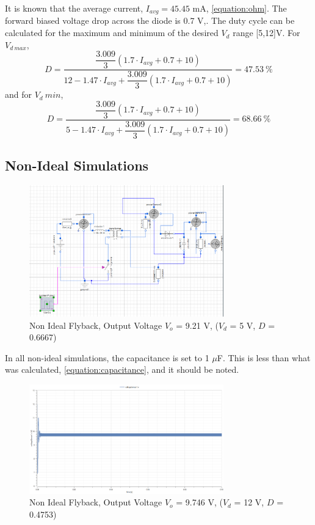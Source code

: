 \documentclass[12pt,twoside]{scrartcl}
\begin{document}
    It is known that the average current, $I_{avg} = 45.45$ mA, \ref{equation:ohm}. The forward biased voltage drop across the diode is 0.7 V,\cite{RN3}. The duty cycle can 
    be calculated for the maximum and minimum of the desired $V_d$ range [5,12]V. For $V_{d\:max}$,
    \begin{equation}
        D  = \frac{\dfrac{3.009}{3}(1.7\cdot I_{avg} + 0.7 + 10)}{12 - 1.47\cdot I_{avg} + \dfrac{3.009}{3}(1.7\cdot I_{avg} + 0.7 + 10)} = 47.53\: \%
    \end{equation}
    and for $V_d\:min$,
    \begin{equation}
        D  = \frac{\dfrac{3.009}{3}(1.7\cdot I_{avg} + 0.7 + 10)}{5 - 1.47\cdot I_{avg} + \dfrac{3.009}{3}(1.7\cdot I_{avg} + 0.7 + 10)} = 68.66\: \%
    \end{equation}

\newpage

\subsection{Non-Ideal Simulations}

\begin{figure}[htp]
    \centering
    \includegraphics[width=0.75\textwidth]{ModellicaNonIdeal.PNG}
    \caption{Non Ideal Flyback, Output Voltage $V_o$ = 9.21 V, ($V_d$ = 5 V, $D$ = 0.6667)}
    \label{fig:NonIdealModellica}
\end{figure}
\noindent
In all non-ideal simulations, the capacitance is set to 1 $\mu$F. This is less than what was calculated, \ref{equation:capacitance}, and it should be noted.

\newpage
\begin{figure}[htp]
    \centering
    \includegraphics[width=0.75\textwidth]{NonIdealSim12V(calculated).png}
    \caption{Non Ideal Flyback, Output Voltage $V_o$ = 9.746 V, ($V_d$ = 12 V, $D$ = 0.4753)}
    \label{fig:NonIdealSim12Vcal}
\end{figure}
\end{document}
